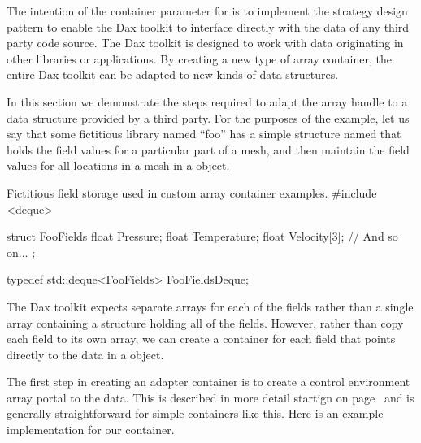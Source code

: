 
The intention of the container parameter for  is to
implement the strategy design pattern to enable the Dax toolkit
to interface directly with the data of any third party code source. The Dax
toolkit is designed to work with data originating in other libraries or
applications. By creating a new type of array container, the entire Dax
toolkit can be adapted to new kinds of data structures.

In this section we demonstrate the steps required to adapt the array handle
to a data structure provided by a third party. For the purposes of the
example, let us say that some fictitious library named ``foo'' has a simple
structure named  that holds the field values for a
particular part of a mesh, and then maintain the field values for all
locations in a mesh in a  object.

\begin{daxexample}{Fictitious field storage used in custom array container examples.}
#include <deque>

struct FooFields {
  float Pressure;
  float Temperature;
  float Velocity[3];
  // And so on...
};

typedef std::deque<FooFields> FooFieldsDeque;
\end{daxexample}

The Dax toolkit expects separate arrays for each of the fields rather than
a single array containing a structure holding all of the fields. However,
rather than copy each field to its own array, we can create a container for
each field that points directly to the data in a 
object.

The first step in creating an adapter container is to create a control
environment array portal to the data. This is described in more detail
startign on page~\pageref{sec:ArrayPortals} and is generally
straightforward for simple containers like this. Here is an example
implementation for our  container.

